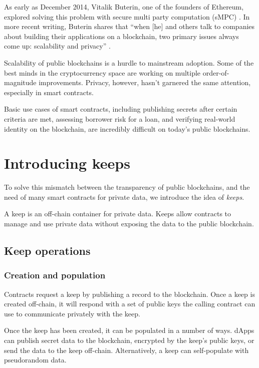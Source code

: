 \documentclass[11pt]{article}
\begin{document}
As early as December 2014, Vitalik Buterin, one of the founders of
Ethereum, explored solving this problem with secure multi party
computation (sMPC) \cite{secretSharingDaos}. In more recent writing,
Buterin shares that ``when [he] and others talk to companies about
building their applications on a blockchain, two primary issues always
come up: scalability and privacy'' \cite{privacyOnTheBlockchain}.

Scalability of public blockchains is a hurdle to mainstream adoption.
Some of the best minds in the cryptocurrency space \cite{lightning}
\cite{ethereumSharding} \cite{plasma} are working on multiple
order-of-magnitude improvements. Privacy, however, hasn't garnered the
same attention, especially in smart contracts.

Basic use cases of smart contracts, including publishing secrets after
certain criteria are met, assessing borrower risk for a loan, and
verifying real-world identity on the blockchain, are incredibly
difficult on today's public blockchains.

\section{Introducing keeps}

To solve this mismatch between the transparency of public blockchains,
and the need of many smart contracts for private data, we introduce
the idea of {\em keeps}.

A keep is an off-chain container for private data. Keeps allow
contracts to manage and use private data without exposing the data to
the public blockchain.

\subsection{Keep operations}

\subsubsection{Creation and population}

Contracts request a keep by publishing a record to the blockchain.
Once a keep is created off-chain, it will respond with a set of public
keys the calling contract can use to communicate privately with the
keep.

Once the keep has been created, it can be populated in a number of
ways. dApps can publish secret data to the blockchain, encrypted by
the keep's public keys, or send the data to the keep off-chain.
Alternatively, a keep can self-populate with pseudorandom data.
\end{document}
